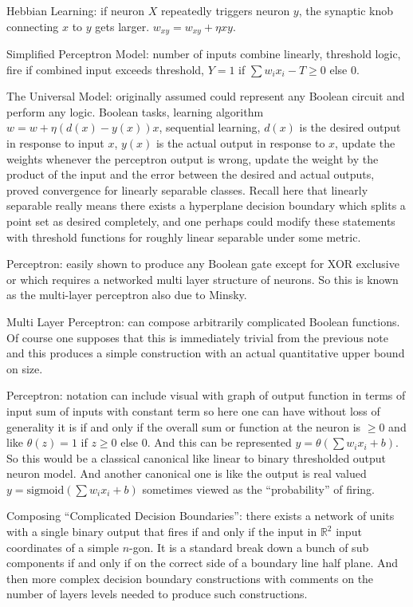 Hebbian Learning: if neuron $X$ repeatedly triggers neuron $y$, the synaptic knob connecting $x$ to $y$ gets larger. $w_{xy} = w_{xy} + \eta xy$.

Simplified Perceptron Model: number of inputs combine linearly, threshold logic, fire if combined input exceeds threshold, $Y = 1$ if $\sum w_i x_i - T \ge 0$ else $0$.

The Universal Model: originally assumed could represent any Boolean circuit and perform any logic. Boolean tasks, learning algorithm $w = w + \eta (d(x) - y(x)) x$, sequential learning, $d(x)$ is the desired output in response to input $x$, $y(x)$ is the actual output in response to $x$, update the weights whenever the perceptron output is wrong, update the weight by the product of the input and the error between the desired and actual outputs, proved convergence for linearly separable classes. Recall here that linearly separable really means there exists a hyperplane decision boundary which splits a point set as desired completely, and one perhaps could modify these statements with threshold functions for roughly linear separable under some metric.

Perceptron: easily shown to produce any Boolean gate except for XOR exclusive or which requires a networked multi layer structure of neurons. So this is known as the multi-layer perceptron also due to Minsky.

Multi Layer Perceptron: can compose arbitrarily complicated Boolean functions. Of course one supposes that this is immediately trivial from the previous note and this produces a simple construction with an actual quantitative upper bound on size.

Perceptron: notation can include visual with graph of output function in terms of input sum of inputs with constant term so here one can have without loss of generality it is if and only if the overall sum or function at the neuron is $\ge 0$ and like $\theta (z) = 1$ if $z \ge 0$ else $0$. And this can be represented $y = \theta (\sum w_i x_i + b)$. So this would be a classical canonical like linear to binary thresholded output neuron model. And another canonical one is like the output is real valued $y=\text{sigmoid}(\sum w_i x_i + b)$ sometimes viewed as the ``probability'' of firing.

Composing ``Complicated Decision Boundaries'': there exists a network of units with a single binary output that fires if and only if the input in $\mathbb{R}^2$ input coordinates of a simple $n$-gon. It is a standard break down a bunch of sub components if and only if on the correct side of a boundary line half plane. And then more complex decision boundary constructions with comments on the number of layers levels needed to produce such constructions.

